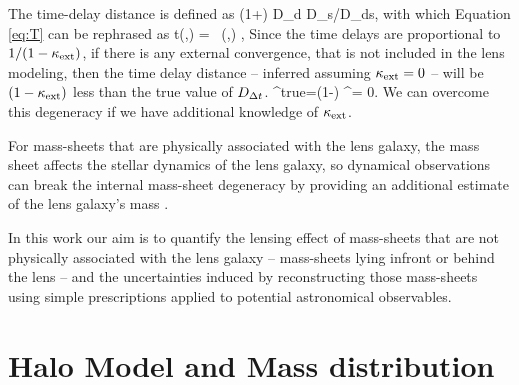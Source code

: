 \documentclass[useAMS,usenatbib]{mn2e}
\begin{document}

The time-delay distance is defined as
\be \label{eq:dt}
\Dt \equiv (1+\zd) D_{\rm d} D_{\rm s}/D_{\rm ds},
\ee
with which Equation \ref{eq:T} can be rephrased as
\be
\Delta t(\bmath{\theta},\bmath{\beta})  =   \, \phi(\bmath{\theta},\bmath{\beta})    ,
\ee 
Since the time delays are proportional to $1/ (1- \kappa_{\rm ext})$, if there is any external convergence, that is not included in the lens
modeling, then the time delay distance -- inferred assuming $\kappa_{\rm ext} = 0$ -- will be
$(1-\kappa_{\rm ext})$ less than the true value of $D_{\Delta t}$.
\be 
\label{eq:MassSheet:H0bias}
\Dt^{\rm{true}}=(1-\kappax) \Dt^{{\kappax = 0}}.
\ee
We can overcome this degeneracy if we have additional knowledge of $\kappa_{\rm ext}$.

For mass-sheets that are physically associated with the lens galaxy, the mass sheet
 affects the stellar dynamics of the
lens galaxy, so dynamical observations can break the internal
mass-sheet degeneracy by providing an additional estimate of the lens galaxy's mass
\citep[e.g.,][]{citations}. 

In this work our aim is to quantify the lensing effect of mass-sheets that are not physically associated with the lens galaxy -- mass-sheets
lying infront or behind the lens -- and the uncertainties induced by reconstructing
those mass-sheets using simple prescriptions applied to potential astronomical observables.



\section{Halo Model and Mass distribution}
\label{sec:model}

%
\end{document}
